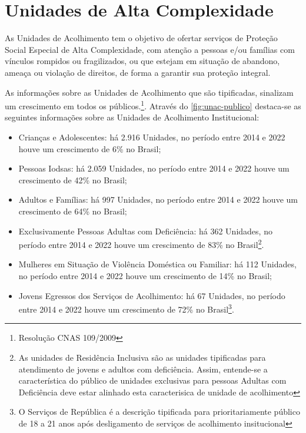 \documentclass[
  brazilian]{report}
\begin{document}
\hypertarget{unidades-de-alta-complexidade}{%
\section{Unidades de Alta
Complexidade}\label{unidades-de-alta-complexidade}}

As Unidades de Acolhimento tem o objetivo de ofertar serviços de
Proteção Social Especial de Alta Complexidade, com atenção a pessoas
e/ou famílias com vínculos rompidos ou fragilizados, ou que estejam em
situação de abandono, ameaça ou violação de direitos, de forma a
garantir sua proteção integral.

As informações sobre as Unidades de Acolhimento que são tipificadas,
sinalizam um crescimento em todos os
públicos.\footnote{Resolução CNAS 109/2009}. Através do
\cref{fig:unac-publico} destaca-se as seguintes informações sobre as
Unidades de Acolhimento Institucional:

\begin{itemize}
\item
  Crianças e Adolescentes: há 2.916 Unidades, no período entre 2014 e
  2022 houve um crescimento de 6\% no Brasil;
\item
  Pessoas Iodsas: há 2.059 Unidades, no período entre 2014 e 2022 houve
  um crescimento de 42\% no Brasil;
\item
  Adultos e Famílias: há 997 Unidades, no período entre 2014 e 2022
  houve um crescimento de 64\% no Brasil;
\item
  Exclusivamente Pessoas Adultas com Deficiência: há 362 Unidades, no
  período entre 2014 e 2022 houve um crescimento de 83\% no
  Brasil\footnote{As unidades de Residência Inclusiva são as unidades tipificadas para atendimento de jovens e adultos com deficiência. Assim, entende-se a característica do público de unidades exclusivas para pessoas Adultas com Deficiência deve estar alinhado esta caracterisica de unidade de acolhimento}.
\item
  Mulheres em Situação de Violência Doméstica ou Familiar: há 112
  Unidades, no período entre 2014 e 2022 houve um crescimento de 14\% no
  Brasil;
\item
  Jovens Egressos dos Serviços de Acolhimento: há 67 Unidades, no
  período entre 2014 e 2022 houve um crescimento de 72\% no
  Brasil\footnote{O Serviços de República é a descrição tipificada para prioritariamente público de 18 a 21 anos após desligamento de serviços de acolhimento insitucional}.
\end{itemize}
\end{document}
